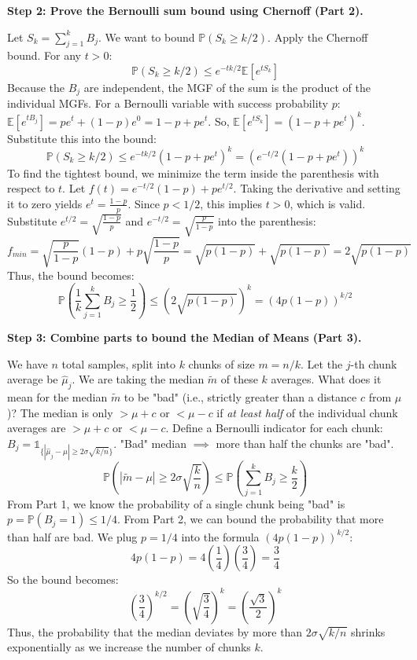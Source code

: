 \begin{solution}
\textbf{Step 2: Prove the Bernoulli sum bound using Chernoff (Part 2).}

Let $S_k = \sum_{j=1}^k B_j$. We want to bound $\mathbb{P}(S_k \geq k/2)$.
Apply the Chernoff bound. For any $t > 0$:
\[ \mathbb{P}(S_k \geq k/2) \leq e^{-t k/2} \mathbb{E}[e^{t S_k}] \]
Because the $B_j$ are independent, the MGF of the sum is the product of the individual MGFs.
For a Bernoulli variable with success probability $p$: $\mathbb{E}[e^{t B_j}] = p e^t + (1-p)e^0 = 1 - p + p e^t$.
So, $\mathbb{E}[e^{t S_k}] = (1 - p + p e^t)^k$.
Substitute this into the bound:
\[ \mathbb{P}(S_k \geq k/2) \leq e^{-t k/2} (1 - p + p e^t)^k = \left( e^{-t/2} (1 - p + p e^t) \right)^k \]
To find the tightest bound, we minimize the term inside the parenthesis with respect to $t$. Let $f(t) = e^{-t/2}(1-p) + p e^{t/2}$.
Taking the derivative and setting it to zero yields $e^t = \frac{1-p}{p}$. Since $p < 1/2$, this implies $t > 0$, which is valid.
Substitute $e^{t/2} = \sqrt{\frac{1-p}{p}}$ and $e^{-t/2} = \sqrt{\frac{p}{1-p}}$ into the parenthesis:
\[ f_{min} = \sqrt{\frac{p}{1-p}} (1-p) + p \sqrt{\frac{1-p}{p}} = \sqrt{p(1-p)} + \sqrt{p(1-p)} = 2\sqrt{p(1-p)} \]
Thus, the bound becomes:
\[ \mathbb{P}\left(\frac{1}{k} \sum_{j=1}^k B_j \geq \frac{1}{2}\right) \leq \left( 2\sqrt{p(1-p)} \right)^k = (4p(1-p))^{k/2} \]

\textbf{Step 3: Combine parts to bound the Median of Means (Part 3).}

We have $n$ total samples, split into $k$ chunks of size $m = n/k$.
Let the $j$-th chunk average be $\hat{\mu}_j$. We are taking the median $\tilde{m}$ of these $k$ averages.
What does it mean for the median $\tilde{m}$ to be "bad" (i.e., strictly greater than a distance $c$ from $\mu$)?
The median is only $> \mu + c$ or $< \mu - c$ if \textit{at least half} of the individual chunk averages are $> \mu + c$ or $< \mu - c$.
Define a Bernoulli indicator for each chunk: $B_j = \mathbb{1}_{\{|\hat{\mu}_j - \mu| \geq 2\sigma \sqrt{k/n}\}}$.
"Bad" median $\implies$ more than half the chunks are "bad".
\[ \mathbb{P} \left( |\tilde{m} - \mu| \geq 2\sigma \sqrt{\frac{k}{n}} \right) \leq \mathbb{P}\left( \sum_{j=1}^k B_j \geq \frac{k}{2} \right) \]
From Part 1, we know the probability of a single chunk being "bad" is $p = \mathbb{P}(B_j = 1) \leq 1/4$.
From Part 2, we can bound the probability that more than half are bad. We plug $p = 1/4$ into the formula $(4p(1-p))^{k/2}$:
\[ 4p(1-p) = 4\left(\frac{1}{4}\right)\left(\frac{3}{4}\right) = \frac{3}{4} \]
So the bound becomes:
\[ \left( \frac{3}{4} \right)^{k/2} = \left( \sqrt{\frac{3}{4}} \right)^k = \left( \frac{\sqrt{3}}{2} \right)^k \]
Thus, the probability that the median deviates by more than $2\sigma \sqrt{k/n}$ shrinks exponentially as we increase the number of chunks $k$.
\end{solution}

